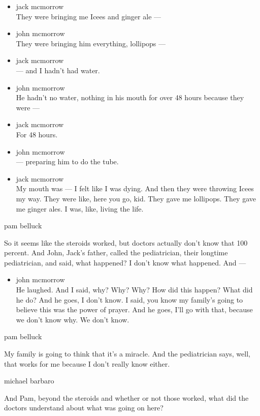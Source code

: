 \begin{itemize}
\item
  jack mcmorrow\\
  They were bringing me Icees and ginger ale ---
\item
  john mcmorrow\\
  They were bringing him everything, lollipops ---
\item
  jack mcmorrow\\
  --- and I hadn't had water.
\item
  john mcmorrow\\
  He hadn't no water, nothing in his mouth for over 48 hours because
  they were ---
\item
  jack mcmorrow\\
  For 48 hours.
\item
  john mcmorrow\\
  --- preparing him to do the tube.
\item
  jack mcmorrow\\
  My mouth was --- I felt like I was dying. And then they were throwing
  Icees my way. They were like, here you go, kid. They gave me
  lollipops. They gave me ginger ales. I was, like, living the life.
\end{itemize}

pam belluck

So it seems like the steroids worked, but doctors actually don't know
that 100 percent. And John, Jack's father, called the pediatrician,
their longtime pediatrician, and said, what happened? I don't know what
happened. And ---

\begin{itemize}
\tightlist
\item
  john mcmorrow\\
  He laughed. And I said, why? Why? Why? How did this happen? What did
  he do? And he goes, I don't know. I said, you know my family's going
  to believe this was the power of prayer. And he goes, I'll go with
  that, because we don't know why. We don't know.
\end{itemize}

pam belluck

My family is going to think that it's a miracle. And the pediatrician
says, well, that works for me because I don't really know either.

michael barbaro

And Pam, beyond the steroids and whether or not those worked, what did
the doctors understand about what was going on here?


